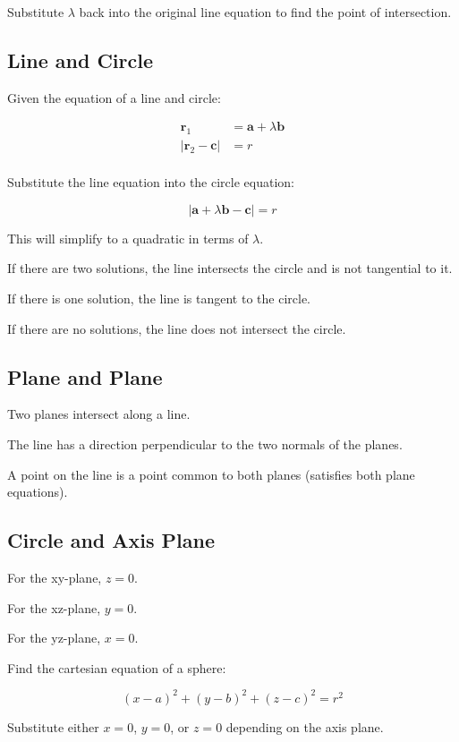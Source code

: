 \documentclass[a4paper,11pt]{report}
\newcommand{\bb}{\boldsymbol}
\begin{document}
Substitute $\lambda$ back into the original line equation to find the point of
intersection.

\subsection{Line and Circle}

Given the equation of a line and circle:

$$
\begin{aligned}
\bb{r}_1 & = \bb{a} + \lambda \bb{b} \\
\lvert \bb{r}_2 - \bb{c} \rvert & = r \\
\end{aligned}
$$

Substitute the line equation into the circle equation:

$$
\lvert \bb{a} + \lambda \bb{b} - \bb{c} \rvert = r
$$

This will simplify to a quadratic in terms of $\lambda$.

If there are two solutions, the line intersects the circle and is not
tangential to it.

If there is one solution, the line is tangent to the circle.

If there are no solutions, the line does not intersect the circle.

\subsection{Plane and Plane}

Two planes intersect along a line.

The line has a direction perpendicular to the two normals of the planes.

A point on the line is a point common to both planes (satisfies both plane
equations).

\subsection{Circle and Axis Plane}

For the xy-plane, $z = 0$.

For the xz-plane, $y = 0$.

For the yz-plane, $x = 0$.

Find the cartesian equation of a sphere:

$$
(x - a)^2 + (y - b)^2 + (z - c)^2 = r^2
$$

Substitute either $x = 0$, $y = 0$, or $z = 0$ depending on the axis plane.
\end{document}
